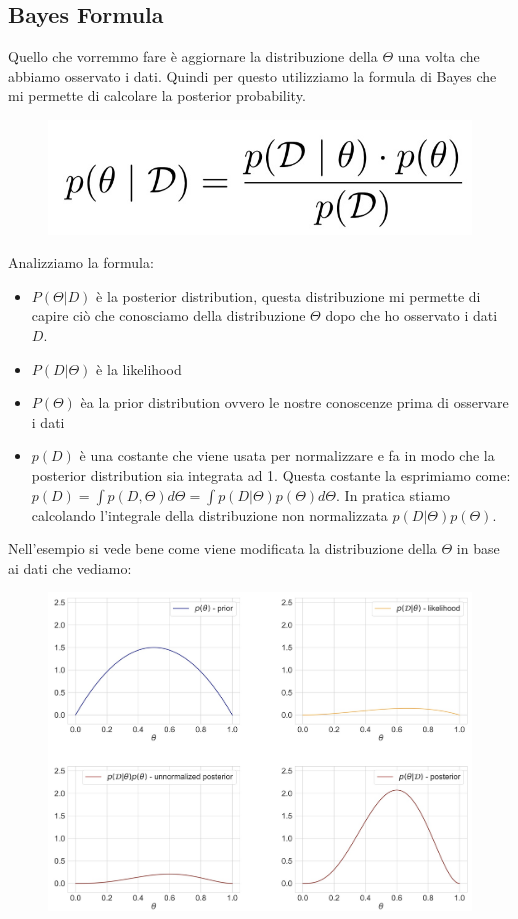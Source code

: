 \documentclass[14pt]{extreport}
\begin{document}
\subsection{Bayes Formula}

Quello che vorremmo fare è aggiornare la distribuzione della $\Theta$ una volta che abbiamo osservato i dati. Quindi per questo utilizziamo la formula
di Bayes che mi permette di calcolare la posterior probability.

\begin{figure}[H]
	\centering
	\includegraphics[width=0.4\linewidth]{30.jpeg}
\end{figure}

Analizziamo la formula:
\begin{itemize}
	\item $P(\Theta | D)$ è la posterior distribution, questa distribuzione mi permette di capire ciò che conosciamo della distribuzione $\Theta$ dopo
	che ho osservato i dati $D$.
	\item $P(D|\Theta)$ è la likelihood
	\item $P(\Theta)$ èa la prior distribution ovvero le nostre conoscenze prima di osservare i dati
	\item $p(D)$ è una costante che viene usata per normalizzare e fa in modo che la posterior distribution sia integrata ad 1. Questa costante la
	      esprimiamo come: $p(D) = \int p(D,\Theta) d\Theta = \int p(D|\Theta) p(\Theta) d\Theta$. In pratica stiamo calcolando l'integrale della
	      distribuzione non normalizzata $p(D|\Theta) p(\Theta)$.
\end{itemize}

Nell'esempio si vede bene come viene modificata la distribuzione della $\Theta$ in base ai dati che vediamo:

\begin{figure}[H]
	\centering
	\includegraphics[width=0.7\linewidth]{31.jpeg}
\end{figure}
\end{document}
